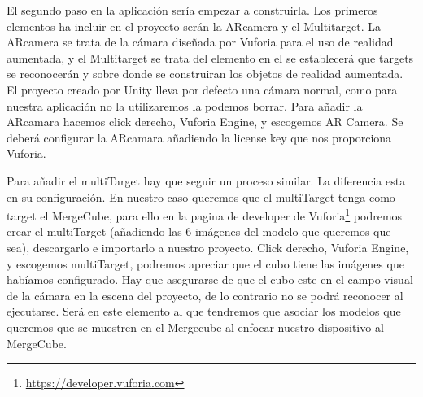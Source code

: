 

El segundo paso en la aplicación sería empezar a construirla. 
Los primeros elementos ha incluir en el proyecto serán la ARcamera y el Multitarget.
La ARcamera se trata de la cámara diseñada por Vuforia para el uso de realidad aumentada, y el Multitarget se trata del elemento en el se establecerá que targets se reconocerán y sobre donde se construiran los objetos de realidad aumentada.
El proyecto creado por Unity lleva por defecto una cámara normal, como para nuestra aplicación no la utilizaremos la podemos borrar.
Para añadir la ARcamara hacemos click derecho, Vuforia Engine, y escogemos AR Camera. Se deberá configurar la ARcamara añadiendo la license key que nos proporciona Vuforia.

Para añadir el multiTarget hay que seguir un proceso similar. La diferencia esta en su configuración. En nuestro caso queremos que el multiTarget tenga como target el MergeCube, para ello en la pagina de developer de Vuforia\footnote{\url{https://developer.vuforia.com}} podremos crear el multiTarget (añadiendo las 6 imágenes del modelo que queremos que sea), descargarlo e importarlo a nuestro proyecto. 
Click derecho, Vuforia Engine, y escogemos multiTarget, podremos apreciar que el cubo tiene las imágenes que habíamos configurado. Hay que asegurarse de que el cubo este en el campo visual de la cámara en la escena del proyecto, de lo contrario no se podrá reconocer al ejecutarse. Será en este elemento al que tendremos que asociar los modelos que queremos que se muestren en el Mergecube al enfocar nuestro dispositivo al MergeCube.

